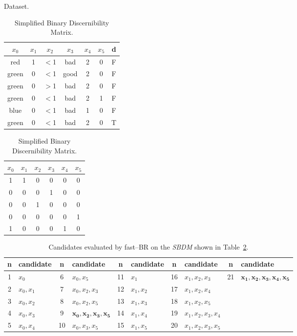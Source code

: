 \documentclass[citenumber]{elsarticle}
\begin{document}
	\begin{table}[htb]
		\begin{minipage}{.4\linewidth}
			\caption{Dataset.} \label{tab:dataset}
			\centering
		 	\begin{tabular}{cccccc|c}
		 		$x_0$ & $x_1$ & $x_2$ & $x_3$ & $x_4$ & $x_5$ & d \\
		 		\hline
				red   & 1 & $<$1 & bad  & 2 & 0 & F \\
				green & 0 & $<$1 & good & 2 & 0 & F \\
				green & 0 & $>$1 & bad  & 2 & 0 & F \\
				green & 0 & $<$1 & bad  & 2 & 1 & F \\
				blue  & 0 & $<$1 & bad  & 1 & 0 & F \\
				green & 0 & $<$1 & bad  & 2 & 0 & T
		 	\end{tabular}       
		\end{minipage}  
		\begin{minipage}{.59\linewidth}
			\caption{Simplified Binary Discernibility Matrix.} \label{tab:SBDM}
			\centering
			\begin{tabular}{cccccc}
				$x_0$ & $x_1$ & $x_2$ & $x_3$ & $x_4$ & $x_5$ \\
				\hline
				1 & 1 & 0 & 0 & 0 & 0 \\
				0 & 0 & 0 & 1 & 0 & 0 \\
				0 & 0 & 1 & 0 & 0 & 0 \\
				0 & 0 & 0 & 0 & 0 & 1 \\
				1 & 0 & 0 & 0 & 1 & 0
			\end{tabular}       
			\bigskip
		\end{minipage}    
 	\end{table}
 
 \begin{table}[htb]
 		\caption{Candidates evaluated by fast--BR on the \textit{SBDM} shown in Table~\ref{tab:SBDM}.} \label{tab:cand}
 		\small
 		\centering
 		\setlength{\tabcolsep}{3pt}
 	 	\begin{tabular}{cl|cl|cl|cl|cl}
 	 		n & candidate & n & candidate & n & candidate & n & candidate & n & candidate \\
 	 		\hline
			1 & ${x_0}$     & 6  & ${x_0,x_5}$         & 11 & ${x_1}$     & 16 & ${x_1,x_2,x_3}$     & 21 & $\mathbf{{x_1,x_2,x_3,x_4,x_5}}$  \\
			2 & ${x_0,x_1}$ & 7  & ${x_0,x_2,x_3}$     & 12 & ${x_1,x_2}$ & 17 & ${x_1,x_2,x_4}$     &   \\
			3 & ${x_0,x_2}$ & 8  & ${x_0,x_2,x_5}$     & 13 & ${x_1,x_3}$ & 18 & ${x_1,x_2,x_5}$     &   \\
			4 & ${x_0,x_3}$ & 9  & $\mathbf{{x_0,x_2,x_3,x_5}}$ & 14 & ${x_1,x_4}$ & 19 & ${x_1,x_2,x_3,x_4}$ &   \\
			5 & ${x_0,x_4}$ & 10 & ${x_0,x_3,x_5}$     & 15 & ${x_1,x_5}$ & 20 & ${x_1,x_2,x_3,x_5}$ &       
 	 	\end{tabular}             
  	\end{table}	
 	
\end{document}
